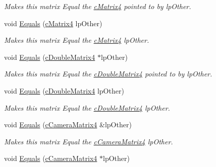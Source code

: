 \begin{DoxyCompactItemize}
\begin{DoxyCompactList}\small\item\em Makes this matrix Equal the \hyperlink{classc_matrix4}{cMatrix4} pointed to by lpOther. \end{DoxyCompactList}\item 
\hypertarget{classc_matrix4_ac5ed8437aa32a05185d51b9472640a8d}{
void \hyperlink{classc_matrix4_ac5ed8437aa32a05185d51b9472640a8d}{Equals} (\hyperlink{classc_matrix4}{cMatrix4} lpOther)}
\label{classc_matrix4_ac5ed8437aa32a05185d51b9472640a8d}

\begin{DoxyCompactList}\small\item\em Makes this matrix Equal the \hyperlink{classc_matrix4}{cMatrix4} lpOther. \end{DoxyCompactList}\item 
\hypertarget{classc_matrix4_a1343c34e7b128e2bf4cf45c256746324}{
void \hyperlink{classc_matrix4_a1343c34e7b128e2bf4cf45c256746324}{Equals} (\hyperlink{classc_double_matrix4}{cDoubleMatrix4} $\ast$lpOther)}
\label{classc_matrix4_a1343c34e7b128e2bf4cf45c256746324}

\begin{DoxyCompactList}\small\item\em Makes this matrix Equal the \hyperlink{classc_double_matrix4}{cDoubleMatrix4} pointed to by lpOther. \end{DoxyCompactList}\item 
\hypertarget{classc_matrix4_afecfb51e689b472fa6ff3a2cebffa869}{
void \hyperlink{classc_matrix4_afecfb51e689b472fa6ff3a2cebffa869}{Equals} (\hyperlink{classc_double_matrix4}{cDoubleMatrix4} lpOther)}
\label{classc_matrix4_afecfb51e689b472fa6ff3a2cebffa869}

\begin{DoxyCompactList}\small\item\em Makes this matrix Equal the \hyperlink{classc_double_matrix4}{cDoubleMatrix4} lpOther. \end{DoxyCompactList}\item 
\hypertarget{classc_matrix4_a0af5e0b1dbbe6d7f4c512a5f07f1e273}{
void \hyperlink{classc_matrix4_a0af5e0b1dbbe6d7f4c512a5f07f1e273}{Equals} (\hyperlink{classc_camera_matrix4}{cCameraMatrix4} \&lpOther)}
\label{classc_matrix4_a0af5e0b1dbbe6d7f4c512a5f07f1e273}

\begin{DoxyCompactList}\small\item\em Makes this matrix Equal the \hyperlink{classc_camera_matrix4}{cCameraMatrix4} lpOther. \end{DoxyCompactList}\item 
\hypertarget{classc_matrix4_a12b028ad76a776c5a01d695ea620962b}{
void \hyperlink{classc_matrix4_a12b028ad76a776c5a01d695ea620962b}{Equals} (\hyperlink{classc_camera_matrix4}{cCameraMatrix4} $\ast$lpOther)}
\label{classc_matrix4_a12b028ad76a776c5a01d695ea620962b}


\end{DoxyCompactItemize}
